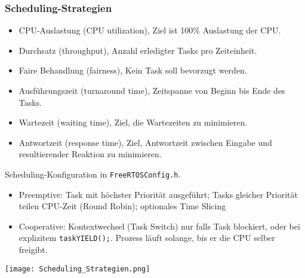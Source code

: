 \subsubsection{Scheduling-Strategien}

\begin{itemize}
	\itemsep-.5em 
	\item CPU-Auslastung (CPU utilization), Ziel ist 100\% Auslastung der CPU.
	\item Durchsatz (throughput), Anzahl erledigter Tasks pro Zeiteinheit.
	\item Faire Behandlung (fairness), Kein Task soll bevorzugt werden.
	\item Ausführungszeit (turnaround time), Zeitspanne von Beginn bis Ende des Tasks.
	\item Wartezeit (waiting time), Ziel, die Wartezeiten zu minimieren.
	\item Antwortzeit (response time), Ziel, Antwortzeit zwischen Eingabe und resultierender Reaktion zu minimieren.
\end{itemize}

Scheduling-Konfiguration in \lstinline[style=cppstyle]|FreeRTOSConfig.h|.

\begin{itemize}
	\itemsep-.5em 
	\item Preemptive:	Task mit höchster Priorität ausgeführt; Tasks gleicher Priorität teilen CPU-Zeit (Round Robin);	optionales Time Slicing
	\item Cooperative:	Kontextwechsel (Task Switch) nur falls Task blockiert, oder bei explizitem \lstinline[style=cppstyle]|taskYIELD();|. Prozess läuft solange, bis er die CPU selber freigibt.
\end{itemize}

\texttt{[image: Scheduling\_Strategien.png]}

